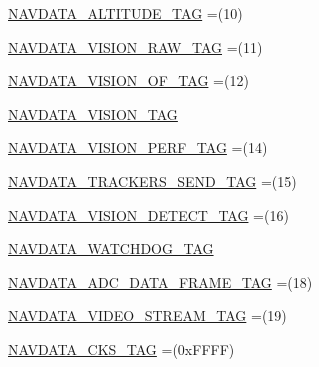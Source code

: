 \begin{DoxyCompactItemize}
\item 
\hyperlink{enumworkspace_1_1_a_r_drone_nav_data_1_1src_1_1controller_1_1_nav_data_tag_a99957ed674efd9372a278918adc0ac23}{N\+A\+V\+D\+A\+T\+A\+\_\+\+A\+L\+T\+I\+T\+U\+D\+E\+\_\+\+T\+A\+G} =(10)
\item 
\hyperlink{enumworkspace_1_1_a_r_drone_nav_data_1_1src_1_1controller_1_1_nav_data_tag_ab79a768fe69547976532b9ef51328b66}{N\+A\+V\+D\+A\+T\+A\+\_\+\+V\+I\+S\+I\+O\+N\+\_\+\+R\+A\+W\+\_\+\+T\+A\+G} =(11)
\item 
\hyperlink{enumworkspace_1_1_a_r_drone_nav_data_1_1src_1_1controller_1_1_nav_data_tag_aefe3d6e51951deb92ab76d4fd2309343}{N\+A\+V\+D\+A\+T\+A\+\_\+\+V\+I\+S\+I\+O\+N\+\_\+\+O\+F\+\_\+\+T\+A\+G} =(12)
\item 
\hyperlink{enumworkspace_1_1_a_r_drone_nav_data_1_1src_1_1controller_1_1_nav_data_tag_a8035ac7ac20404455f0e55feb08ca33e}{N\+A\+V\+D\+A\+T\+A\+\_\+\+V\+I\+S\+I\+O\+N\+\_\+\+T\+A\+G}
\item 
\hyperlink{enumworkspace_1_1_a_r_drone_nav_data_1_1src_1_1controller_1_1_nav_data_tag_a57bfba5c9d97d6278fed3b8797a06c23}{N\+A\+V\+D\+A\+T\+A\+\_\+\+V\+I\+S\+I\+O\+N\+\_\+\+P\+E\+R\+F\+\_\+\+T\+A\+G} =(14)
\item 
\hyperlink{enumworkspace_1_1_a_r_drone_nav_data_1_1src_1_1controller_1_1_nav_data_tag_a80660f5e59894f24a0cd004144ebb4fc}{N\+A\+V\+D\+A\+T\+A\+\_\+\+T\+R\+A\+C\+K\+E\+R\+S\+\_\+\+S\+E\+N\+D\+\_\+\+T\+A\+G} =(15)
\item 
\hyperlink{enumworkspace_1_1_a_r_drone_nav_data_1_1src_1_1controller_1_1_nav_data_tag_adb464e56a37f4e364e7d1c1ee9e60fa2}{N\+A\+V\+D\+A\+T\+A\+\_\+\+V\+I\+S\+I\+O\+N\+\_\+\+D\+E\+T\+E\+C\+T\+\_\+\+T\+A\+G} =(16)
\item 
\hyperlink{enumworkspace_1_1_a_r_drone_nav_data_1_1src_1_1controller_1_1_nav_data_tag_ab8546ff051fed36a2fbdf64fa84a1e1a}{N\+A\+V\+D\+A\+T\+A\+\_\+\+W\+A\+T\+C\+H\+D\+O\+G\+\_\+\+T\+A\+G}
\item 
\hyperlink{enumworkspace_1_1_a_r_drone_nav_data_1_1src_1_1controller_1_1_nav_data_tag_aa56e262fb10166e236f3bc096b745755}{N\+A\+V\+D\+A\+T\+A\+\_\+\+A\+D\+C\+\_\+\+D\+A\+T\+A\+\_\+\+F\+R\+A\+M\+E\+\_\+\+T\+A\+G} =(18)
\item 
\hyperlink{enumworkspace_1_1_a_r_drone_nav_data_1_1src_1_1controller_1_1_nav_data_tag_a67b9f8b45d5237b37b11d0bd09a935bc}{N\+A\+V\+D\+A\+T\+A\+\_\+\+V\+I\+D\+E\+O\+\_\+\+S\+T\+R\+E\+A\+M\+\_\+\+T\+A\+G} =(19)
\item 
\hyperlink{enumworkspace_1_1_a_r_drone_nav_data_1_1src_1_1controller_1_1_nav_data_tag_ae293b66e01dc8215f4e3511f6745b6c8}{N\+A\+V\+D\+A\+T\+A\+\_\+\+C\+K\+S\+\_\+\+T\+A\+G} =(0x\+F\+F\+F\+F)
\end{DoxyCompactItemize}
